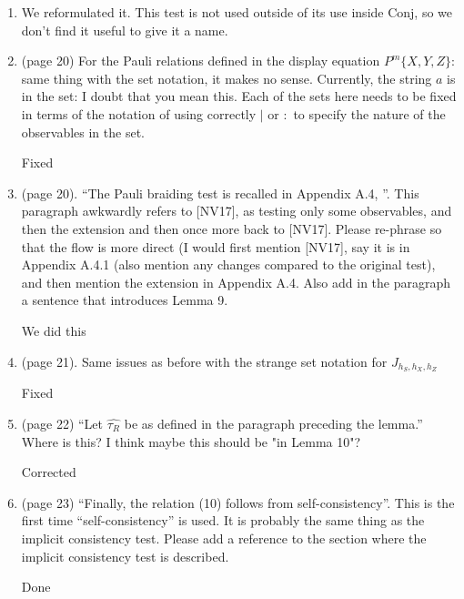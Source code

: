 \documentclass[12pt]{article}
\begin{document}
\begin{enumerate}
		\item We reformulated it. This test is not used outside of its use inside Conj, so we don't find it useful to give it a name. 
		
   \item (page 20) For the Pauli relations defined in the display equation $P^m\{X,Y,Z\}$: same thing with the set notation, it makes no sense. Currently, the string $a$ is in the set: I doubt that you mean this. Each of the sets here needs to be fixed in terms of the notation of using correctly $\mid$ or $:$ to specify the nature of the observables in the set.
	
	{\color{blue} Fixed}
	
    \item (page 20). ``The Pauli braiding test is recalled in Appendix A.4, ''. This paragraph awkwardly refers to [NV17], as testing only some observables, and then the extension and then once more back to [NV17]. Please re-phrase so that the flow is more direct (I would first mention [NV17], say it is in Appendix A.4.1 (also mention any changes compared to the original test), and then mention the extension in Appendix A.4. Also add in the paragraph a sentence that introduces Lemma 9.
		
			{\color{blue} We did this}

     \item (page 21). Same issues as before with the strange set notation for $J_{h_S, h_X, h_Z}$
		
			{\color{blue} Fixed}

\item (page 22) ``Let $\hat{\tau_R}$ be as defined in the paragraph preceding the lemma.'' Where is this? I think maybe this should be "in Lemma 10"?

			{\color{blue} Corrected}

\item (page 23) ``Finally, the relation (10) follows from self-consistency''. This is the first time ``self-consistency'' is used. It is probably the same thing as the implicit consistency test. Please add a reference to the section where the implicit consistency test is described.

			{\color{blue} Done}


\end{enumerate}
\end{document}
